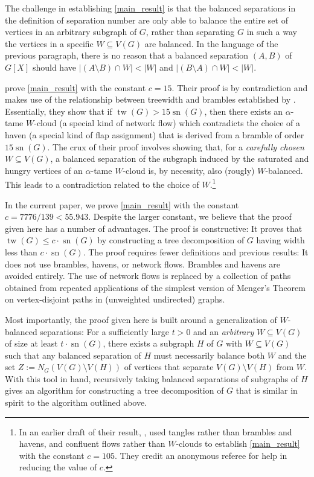 \documentclass{patmorin}
\DeclareMathOperator{\sep}{sn}
\DeclareMathOperator{\tw}{tw}
\begin{document}
The challenge in establishing \cref{main_result} is that the balanced separations in the definition of separation number are only able to balance the entire set of vertices in an arbitrary subgraph of $G$, rather than separating $G$ in such a way the vertices in a specific $W\subseteq V(G)$ are balanced.  In the language of the previous paragraph, there is no reason that a balanced separation $(A,B)$ of $G[X]$ should have $|(A\setminus B)\cap W|<|W|$ and $|(B\setminus A)\cap W|<|W|$.

\citet{dvorak.norin:treewidth} prove \cref{main_result} with the constant $c=15$. Their proof is by contradiction and makes use of the relationship between treewidth and brambles established by \citet{seymour.thomas:graph}.  Essentially, they show that if $\tw(G)>15\sep(G)$, then there exists an $\alpha$-tame $W$-cloud (a special kind of network flow) which contradicts the choice of a haven (a special kind of flap assignment) that is derived from a bramble of order $15\sep(G)$.  The crux of their proof \cite[Proof of Lemma~7]{dvorak.norin:treewidth} involves showing that, for a \emph{carefully chosen} $W\subseteq V(G)$, a balanced separation of the subgraph induced by the saturated and hungry vertices of an $\alpha$-tame $W$-cloud is, by necessity, also (rougly) $W$-balanced. This leads to a contradiction related to the choice of $W$.\footnote{In an earlier draft of their result, \citet{dvorak.norin:treewidth_v1}, used tangles rather than brambles and havens, and confluent flows \cite{chen.kleinberg.ea:almost} rather than $W$-clouds to establish \cref{main_result} with the constant $c=105$.  They credit an anonymous referee for help in reducing the value of $c$.}

In the current paper, we prove \cref{main_result} with the constant $c=7776/139< 55.943$.  Despite the larger constant, we believe that the proof given here has a number of advantages.  The proof is constructive: It proves that $\tw(G)\le c\cdot \sep(G)$ by constructing a tree decomposition of $G$ having width less than $c\cdot\sep(G)$.  The proof requires fewer definitions and previous results: It does not use brambles, havens, or network flows.  Brambles and havens are avoided entirely.  The use of network flows is replaced by a collection of paths obtained from repeated applications of the simplest version of Menger's Theorem on vertex-disjoint paths in (unweighted undirected) graphs.  

Most importantly, the proof given here is built around a generalization of $W$-balanced separations:  For a sufficiently large $t>0$ and an \emph{arbitrary} $W\subseteq V(G)$ of size at least $t\cdot \sep(G)$, there exists a subgraph $H$ of $G$ with $W\subseteq V(G)$ such that any balanced separation of $H$ must necessarily balance both $W$ and the set $Z:=N_G(V(G)\setminus V(H))$ of vertices that separate $V(G)\setminus V(H)$ from $W$. With this tool in hand, recursively taking balanced separations of subgraphs of $H$ gives an algorithm for constructing a tree decomposition of $G$ that is similar in spirit to the algorithm outlined above.
\end{document}
